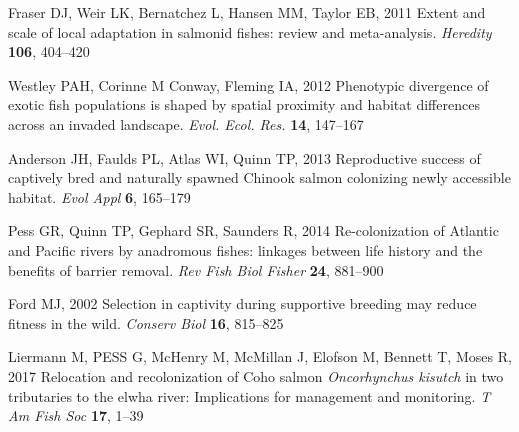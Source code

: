 \documentclass{revtex4}
\begin{document}
\begin{thebibliography}{10}
Fraser DJ, Weir LK, Bernatchez L, Hansen MM, Taylor EB, 2011 {Extent and scale
  of local adaptation in salmonid fishes: review and meta-analysis.}
\newblock \emph{Heredity} \textbf{106}, 404--420

Westley PAH, { Corinne M Conway}, Fleming IA, 2012 {Phenotypic divergence of
  exotic fish populations is shaped by spatial proximity and habitat
  differences across an invaded landscape}.
\newblock \emph{Evol. Ecol. Res.} \textbf{14}, 147--167

Anderson JH, Faulds PL, Atlas WI, Quinn TP, 2013 {Reproductive success of
  captively bred and naturally spawned Chinook salmon colonizing newly
  accessible habitat}.
\newblock \emph{Evol Appl} \textbf{6}, 165--179

Pess GR, Quinn TP, Gephard SR, Saunders R, 2014 {Re-colonization of Atlantic
  and Pacific rivers by anadromous fishes: linkages between life history and
  the benefits of barrier removal}.
\newblock \emph{Rev Fish Biol Fisher} \textbf{24}, 881--900

Ford MJ, 2002 {Selection in captivity during supportive breeding may reduce
  fitness in the wild}.
\newblock \emph{Conserv Biol} \textbf{16}, 815--825

Liermann M, PESS G, McHenry M, McMillan J, Elofson M, Bennett T, Moses R, 2017
  {Relocation and recolonization of Coho salmon \emph{Oncorhynchus kisutch} in
  two tributaries to the elwha river: Implications for management and
  monitoring}.
\newblock \emph{T Am Fish Soc} \textbf{17}, 1--39

\end{thebibliography}



\clearpage
\end{document}
